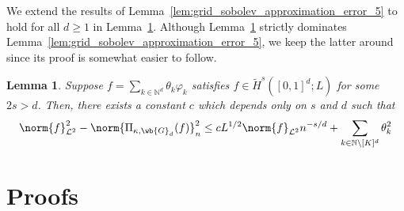 \documentclass{article}
\newcommand{\1}{\mathbf{1}}
\newcommand{\Nbb}{\mathbb{N}}
\newcommand{\Leb}{\mathcal{L}}
\newcommand{\wt}[1]{\widetilde{#1}}
\theoremstyle{alden}
\theoremstyle{aldenthm}
\newtheorem{lemma}{Lemma}
\theoremstyle{definition}
\theoremstyle{remark}
\begin{document}
We extend the results of Lemma~\ref{lem:grid_sobolev_approximation_error_5} to hold for all $d \geq 1$ in Lemma~\ref{lem:grid_sobolev_approximation_error_6}. Although Lemma~\ref{lem:grid_sobolev_approximation_error_6} strictly dominates Lemma~\ref{lem:grid_sobolev_approximation_error_5}, we keep the latter around since its proof is somewhat easier to follow. 
\begin{lemma}
	\label{lem:grid_sobolev_approximation_error_6}
	Suppose $f = \sum_{k \in \Nbb^d} \theta_k \varphi_k$ satisfies $f \in \wt{H}^s([0,1]^d;L)$ for some $2s > d$. Then, there exists a constant $c$ which depends only on $s$ and $d$ such that
	\begin{equation}
	\label{eqn:grid_sobolev_approximation_error_6}
	\norm{f}_{\Leb^2}^2 - \norm{\Pi_{\kappa,\wb{G}_d}(f)}_{n}^2 \leq c L^{1/2} \norm{f}_{\Leb^2} n^{-s/d} + \sum_{k \in \Nbb \setminus [K]^d} \theta_k^2
	\end{equation}
\end{lemma}

\section{Proofs}
\end{document}
